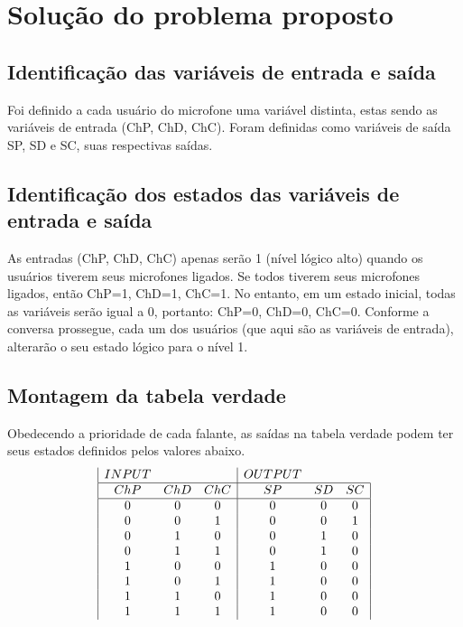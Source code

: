 \documentclass{article}
\begin{document}
\section{Solução do problema proposto}

\subsection{Identificação das variáveis de entrada e saída}
Foi definido a cada usuário do microfone uma variável distinta, estas sendo as variáveis de entrada (ChP, ChD, ChC). Foram definidas como variáveis de saída SP, SD e SC, suas respectivas saídas.

\subsection{Identificação dos estados das variáveis de entrada e saída}
As entradas (ChP, ChD, ChC) apenas serão 1 (nível lógico alto) quando os usuários tiverem seus microfones ligados. Se todos tiverem seus microfones ligados, então ChP=1, ChD=1, ChC=1. No entanto, em um estado inicial, todas as variáveis serão igual a 0, portanto: ChP=0, ChD=0, ChC=0. Conforme a conversa prossegue, cada um dos usuários (que aqui são as variáveis de entrada), alterarão o seu estado lógico para o nível 1.

\subsection{Montagem da tabela verdade}
 Obedecendo a prioridade de cada falante, as saídas na tabela verdade podem ter seus estados definidos pelos valores abaixo.
\begin{displaymath}
\begin{array}{|c c c|c c c|}
INPUT & & & OUTPUT &\\
\hline
ChP & ChD & ChC & SP & SD & SC\\
\hline %
0 & 0 & 0 & 0 & 0 & 0\\
0 & 0 & 1 & 0 & 0 & 1\\
0 & 1 & 0 & 0 & 1 & 0\\
0 & 1 & 1 & 0 & 1 & 0\\
1 & 0 & 0 & 1 & 0 & 0\\
1 & 0 & 1 & 1 & 0 & 0\\
1 & 1 & 0 & 1 & 0 & 0\\
1 & 1 & 1 & 1 & 0 & 0\\
\end{array}
\end{displaymath}
\end{document}
